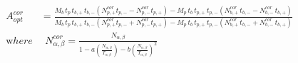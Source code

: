 


\begin{eqnarray*}
&A_{opt}^{cor}& = \frac{
M_b\,t_p\,t_{b,+}\,t_{b,-} \left( N_{p,+}^{cor} t_{p,-} - N_{p,-}^{cor} t_{p,+}\right) - M_p\,t_b\,t_{p,+}\,t_{p,-} \left( N_{b,+}^{cor}\, t_{b,-} - N_{b,-}^{cor}\,t_{b,+}\right)}
{M_b\,t_p\,t_{b,+}\,t_{b,-} \left( N_{p,+}^{cor} t_{p,-} + N_{p,-}^{cor} t_{p,+}\right) - M_p\,t_b\,t_{p,+}\,t_{p,-} \left( N_{b,+}^{cor}\, t_{b,-} + N_{b,-}^{cor}\,t_{b,+}\right)}
\\
&{\mathrm where}& \ \ N_{\alpha,\beta}^{cor}  = \frac{N_{\alpha,\beta}}
    {1 - a\left( \frac{N_{\alpha,\beta}}{T_{\alpha,\beta}} \right) - b \left(
     \frac{N_{\alpha,\beta}}{T_{\alpha,\beta}}\right)^2}
\end{eqnarray*}

